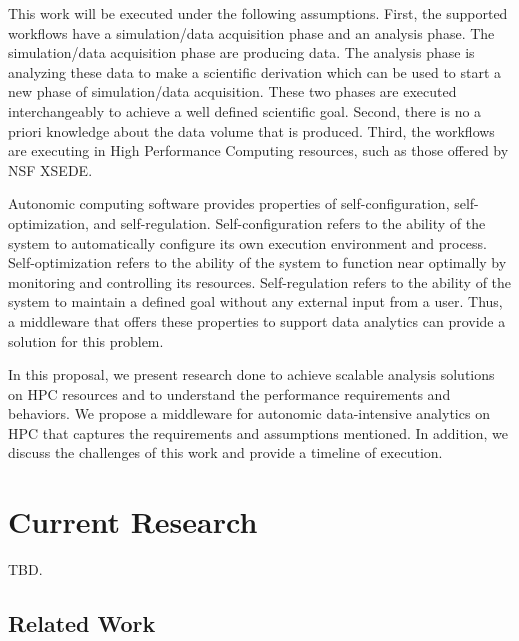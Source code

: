
This work will be executed under the following assumptions. First, the supported 
workflows have a simulation/data acquisition phase and an analysis phase. The 
simulation/data acquisition phase are producing data. The analysis phase is analyzing 
these data to make a scientific derivation which can be used to start a new phase 
of simulation/data acquisition. These two phases are executed interchangeably to 
achieve a well defined scientific goal. Second, there is no a priori knowledge 
about the data volume that is produced. Third, the workflows are executing in 
High Performance Computing resources, such as those offered by NSF XSEDE.


Autonomic computing software provides properties of self-configuration, self-optimization, 
and self-regulation. Self-configuration refers to the ability of the system to 
automatically configure its own execution environment and process. Self-optimization 
refers to the ability of the system to function near optimally by monitoring and 
controlling its resources. Self-regulation refers to the ability of the system to 
maintain a defined goal without any external input from a user. Thus, a middleware 
that offers these properties to support data analytics can provide a solution for 
this problem.

In this proposal, we present research done to achieve scalable analysis solutions 
on HPC resources and to understand the performance requirements and behaviors. We 
propose a middleware for autonomic data-intensive analytics on HPC that captures 
the requirements and assumptions mentioned. In addition, we discuss the challenges 
of this work and provide a timeline of execution.

\section{Current Research}

TBD.

\subsection{Related Work}

